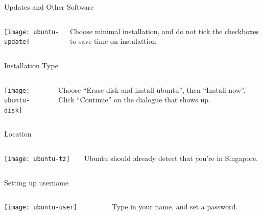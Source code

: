 \documentclass[12pt]{beamer}
\begin{document}
\begin{frame}{Updates and Other Software}
  \begin{columns}
    \begin{column}{0.65\linewidth}
      \texttt{[image: ubuntu-update]}
    \end{column}
    \begin{column}{0.35\linewidth}
      Choose minimal installation, and do not tick the checkboxes to save time on instalattion.
    \end{column}
  \end{columns}
\end{frame}

\begin{frame}{Installation Type}
  \begin{columns}
    \begin{column}{0.65\linewidth}
      \texttt{[image: ubuntu-disk]}
    \end{column}
    \begin{column}{0.35\linewidth}
      Choose ``Erase disk and install ubuntu'', then ``Install now''. Click ``Continue'' on the dialogue that shows up.
    \end{column}
  \end{columns}
\end{frame}

\begin{frame}{Location}
  \begin{columns}
    \begin{column}{0.65\linewidth}
      \texttt{[image: ubuntu-tz]}
    \end{column}
    \begin{column}{0.35\linewidth}
      Ubuntu should already detect that you're in Singapore.
    \end{column}
  \end{columns}
\end{frame}

\begin{frame}{Setting up username}
  \begin{columns}
    \begin{column}{0.65\linewidth}
      \texttt{[image: ubuntu-user]}
    \end{column}
    \begin{column}{0.35\linewidth}
      Type in your name, and set a password.
    \end{column}
  \end{columns}
\end{frame}
\end{document}
